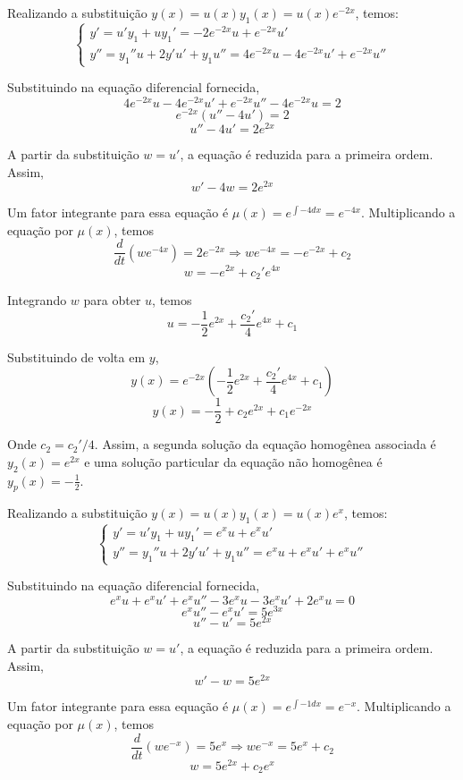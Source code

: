 \documentclass[oneside,12pt,a4paper]{report}
\begin{document}
\begin{resolucao}
    \itemresolucao Realizando a substituição $y(x)=u(x)y_1(x)=u(x)e^{-2x}$, temos:
    \[\begin{cases}
        y'=u'y_1+uy_1'=-2e^{-2x}u+e^{-2x}u'\\
        y''=y_1''u+2y'u'+y_1u''=4e^{-2x}u-4e^{-2x}u'+e^{-2x}u''
    \end{cases}\]

    Substituindo na equação diferencial fornecida, 
    \[4e^{-2x}u-4e^{-2x}u'+e^{-2x}u''-4e^{-2x}u=2\]
    \[e^{-2x}(u''-4u')=2\]
    \[u''-4u'=2e^{2x}\]

    A partir da substituição $w=u'$, a equação é reduzida para a primeira ordem. Assim,
    \[w'-4w=2e^{2x}\]

    Um fator integrante para essa equação é $\mu(x)=e^{\int -4dx}=e^{-4x}$. Multiplicando a equação por $\mu(x)$, temos
    \[\frac{d}{dt}\left(we^{-4x}\right)=2e^{-2x}\Rightarrow we^{-4x}=-e^{-2x}+c_2\]
    \[w=-e^{2x}+c_2'e^{4x}\]

    Integrando $w$ para obter $u$, temos
    \[u=-\frac{1}{2}e^{2x}+\frac{c_2'}{4}e^{4x}+c_1\]

    Substituindo de volta em $y$,
    \[y(x)=e^{-2x}\left(-\frac{1}{2}e^{2x}+\frac{c_2'}{4}e^{4x}+c_1\right)\]
    \[y(x)=-\frac{1}{2}+c_2e^{2x}+c_1e^{-2x}\]

    Onde $c_2=c_2'/4$. Assim, a segunda solução da equação homogênea associada é $\boxed{y_2(x)=e^{2x}}$ e uma solução particular da equação não homogênea é $\boxed{y_p(x)=-\frac{1}{2}}$.

    \itemresolucao Realizando a substituição $y(x)=u(x)y_1(x)=u(x)e^{x}$, temos:
    \[\begin{cases}
        y'=u'y_1+uy_1'=e^{x}u+e^{x}u'\\
        y''=y_1''u+2y'u'+y_1u''=e^{x}u+e^{x}u'+e^{x}u''
    \end{cases}\]

    Substituindo na equação diferencial fornecida, 
    \[e^{x}u+e^{x}u'+e^{x}u''-3e^{x}u-3e^{x}u'+2e^{x}u=0\]
    \[e^xu''-e^xu'=5e^{3x}\]
    \[u''-u'=5e^{2x}\]

    A partir da substituição $w=u'$, a equação é reduzida para a primeira ordem. Assim,
    \[w'-w=5e^{2x}\]

    Um fator integrante para essa equação é $\mu(x)=e^{\int -1dx}=e^{-x}$. Multiplicando a equação por $\mu(x)$, temos
    \[\frac{d}{dt}\left(we^{-x}\right)=5e^{x}\Rightarrow we^{-x}=5e^{x}+c_2\]
    \[w=5e^{2x}+c_2e^{x}\]


\end{resolucao}
\end{document}
